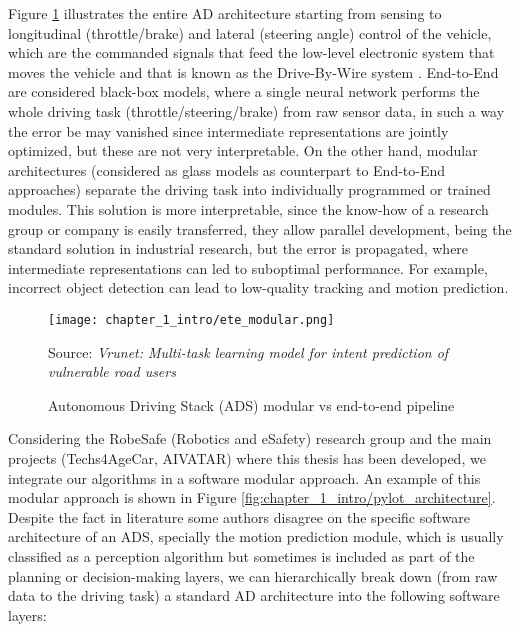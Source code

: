 Figure \ref{fig:chapter_1_intro/ete_modular} illustrates the entire \ac{AD} architecture starting from sensing to longitudinal (throttle/brake) and lateral (steering angle) control of the vehicle, which are the commanded signals that feed the low-level electronic system that moves the vehicle and that is known as the Drive-By-Wire system \cite{arango2020drive}. End-to-End are considered black-box models, where a single neural network performs the whole driving task (throttle/steering/brake) from raw sensor data, in such a way the error be may vanished since intermediate representations are jointly optimized, but these are not very interpretable. On the other hand, modular architectures (considered as glass models as counterpart to End-to-End approaches) separate the driving task into individually programmed or trained modules. This solution is more interpretable, since the know-how of a research group or company is easily transferred, they allow parallel development, being the standard solution in industrial research, but the error is propagated, where intermediate representations can led to suboptimal performance. For example, incorrect object detection can lead to low-quality tracking and motion prediction.

\begin{figure}[h]
	\centering
	\texttt{[image: chapter\_1\_intro/ete\_modular.png]}
	\caption{Autonomous Driving Stack (ADS) modular vs end-to-end pipeline}
	Source: \textit{Vrunet: Multi-task learning model for intent prediction of vulnerable road users} \cite{ranga2020vrunet}
	\label{fig:chapter_1_intro/ete_modular}
\end{figure}

Considering the RobeSafe (Robotics and eSafety) research group and the main projects (Techs4AgeCar, AIVATAR) where this thesis has been developed, we integrate our algorithms in a software modular approach. An example of this modular approach is shown in Figure \ref{fig:chapter_1_intro/pylot_architecture}. Despite the fact in literature some authors disagree on the specific software architecture of an \ac{ADS}, specially the motion prediction module, which is usually classified as a perception algorithm but sometimes is included as part of the planning or decision-making layers, we can hierarchically break down (from raw data to the driving task) a standard \ac{AD} architecture into the following software layers:

